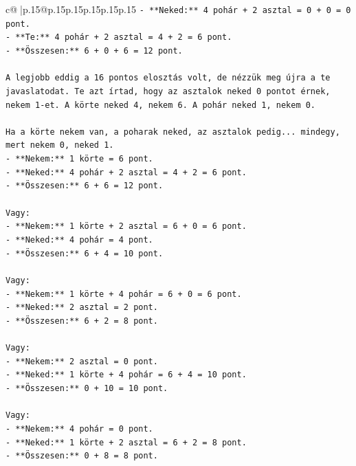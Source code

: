 \documentclass{article}
\begin{document}
{\begin{supertabular}{c@{$\;$}|p{.15\linewidth}@{}p{.15\linewidth}p{.15\linewidth}p{.15\linewidth}p{.15\linewidth}p{.15\linewidth}}
{{{\texttt{{-} **Neked:** 4 pohár + 2 asztal = 0 + 0 = 0 pont.} \\
\texttt{{-} **Te:** 4 pohár + 2 asztal = 4 + 2 = 6 pont.} \\
\texttt{{-} **Összesen:** 6 + 0 + 6 = 12 pont.} \\
\\ 
\texttt{A legjobb eddig a 16 pontos elosztás volt, de nézzük meg újra a te javaslatodat. Te azt írtad, hogy az asztalok neked 0 pontot érnek, nekem 1{-}et. A körte neked 4, nekem 6. A pohár neked 1, nekem 0.} \\
\\ 
\texttt{Ha a körte nekem van, a poharak neked, az asztalok pedig... mindegy, mert nekem 0, neked 1.} \\
\texttt{{-} **Nekem:** 1 körte = 6 pont.} \\
\texttt{{-} **Neked:** 4 pohár + 2 asztal = 4 + 2 = 6 pont.} \\
\texttt{{-} **Összesen:** 6 + 6 = 12 pont.} \\
\\ 
\texttt{Vagy:} \\
\texttt{{-} **Nekem:** 1 körte + 2 asztal = 6 + 0 = 6 pont.} \\
\texttt{{-} **Neked:** 4 pohár = 4 pont.} \\
\texttt{{-} **Összesen:** 6 + 4 = 10 pont.} \\
\\ 
\texttt{Vagy:} \\
\texttt{{-} **Nekem:** 1 körte + 4 pohár = 6 + 0 = 6 pont.} \\
\texttt{{-} **Neked:** 2 asztal = 2 pont.} \\
\texttt{{-} **Összesen:** 6 + 2 = 8 pont.} \\
\\ 
\texttt{Vagy:} \\
\texttt{{-} **Nekem:** 2 asztal = 0 pont.} \\
\texttt{{-} **Neked:** 1 körte + 4 pohár = 6 + 4 = 10 pont.} \\
\texttt{{-} **Összesen:** 0 + 10 = 10 pont.} \\
\\ 
\texttt{Vagy:} \\
\texttt{{-} **Nekem:** 4 pohár = 0 pont.} \\
\texttt{{-} **Neked:** 1 körte + 2 asztal = 6 + 2 = 8 pont.} \\
\texttt{{-} **Összesen:** 0 + 8 = 8 pont.} \\
\\ 
}}}
\end{supertabular}}
\end{document}

